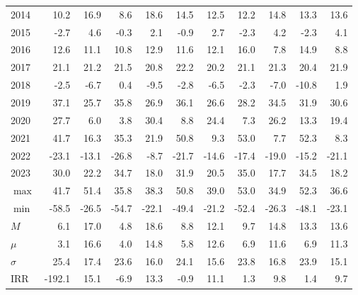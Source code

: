 \documentclass{article}
\begin{document}
\begin{table}[!ht]
\begin{tabular}{l | rr| rr| rr| rr| rr}
2014 & 10.2 & 16.9 & \cellcolor{red!25}8.6 & \cellcolor{green!25}18.6 & 14.5 & 12.5 & 12.2 & 14.8 & 13.3 & 13.6 \\
2015 & \cellcolor{red!25}-2.7 & \cellcolor{green!25}4.6 & -0.3 & 2.1 & -0.9 & 2.7 & -2.3 & 4.2 & -2.3 & 4.1 \\
2016 & 12.6 & 11.1 & 10.8 & 12.9 & 11.6 & 12.1 & \cellcolor{green!25}16.0 & \cellcolor{red!25}7.8 & 14.9 & 8.8 \\
2017 & 21.1 & 21.2 & 21.5 & 20.8 & \cellcolor{green!25}22.2 & \cellcolor{red!25}20.2 & 21.1 & 21.3 & 20.4 & 21.9 \\
2018 & -2.5 & -6.7 & 0.4 & -9.5 & -2.8 & -6.5 & -2.3 & -7.0 & \cellcolor{red!25}-10.8 & \cellcolor{green!25}1.9 \\
2019 & \cellcolor{green!25}37.1 & \cellcolor{red!25}25.7 & 35.8 & 26.9 & 36.1 & 26.6 & 28.2 & 34.5 & 31.9 & 30.6 \\
2020 & 27.7 & 6.0 & \cellcolor{red!25}3.8 & \cellcolor{green!25}30.4 & 8.8 & 24.4 & 7.3 & 26.2 & 13.3 & 19.4 \\
2021 & 41.7 & 16.3 & 35.3 & 21.9 & 50.8 & 9.3 & \cellcolor{green!25}53.0 & \cellcolor{red!25}7.7 & 52.3 & 8.3 \\
2022 & -23.1 & -13.1 & \cellcolor{red!25}-26.8 & \cellcolor{green!25}-8.7 & -21.7 & -14.6 & -17.4 & -19.0 & -15.2 & -21.1 \\
2023 & 30.0 & 22.2 & 34.7 & 18.0 & 31.9 & 20.5 & \cellcolor{green!25}35.0 & \cellcolor{red!25}17.7 & 34.5 & 18.2 \\ \hline
$\max$ & 41.7 & 51.4 & 35.8 & 38.3 & 50.8 & 39.0 & \cellcolor{green!25}53.0 & \cellcolor{red!25}34.9 & 52.3 & 36.6 \\
$\min$ & \cellcolor{red!25}-58.5 & -26.5 & -54.7 & -22.1 & -49.4 & \cellcolor{green!25}-21.2 & -52.4 & -26.3 & -48.1 & -23.1 \\
$M$ & 6.1 & 17.0 & \cellcolor{red!25}4.8 & \cellcolor{green!25}18.6 & 8.8 & 12.1 & 9.7 & 14.8 & 13.3 & 13.6 \\
$\mu$  & \cellcolor{red!25}3.1 & \cellcolor{green!25}16.6 & 4.0 & 14.8 & 5.8 & 12.6 & 6.9 & 11.6 & 6.9 & 11.3 \\
$\sigma$ & \cellcolor{green!25}25.4 & 17.4 & 23.6 & 16.0 & 24.1 & 15.6 & 23.8 & 16.8 & 23.9 & \cellcolor{red!25}15.1 \\       
IRR & -192.1 & 15.1 & -6.9 & 13.3 & -0.9 & 11.1 & 1.3 & 9.8 & 1.4 & 9.7 \\ \hline
    \end{tabular}
    \label{tab_comparison_wl}
\end{table}
\end{document}
